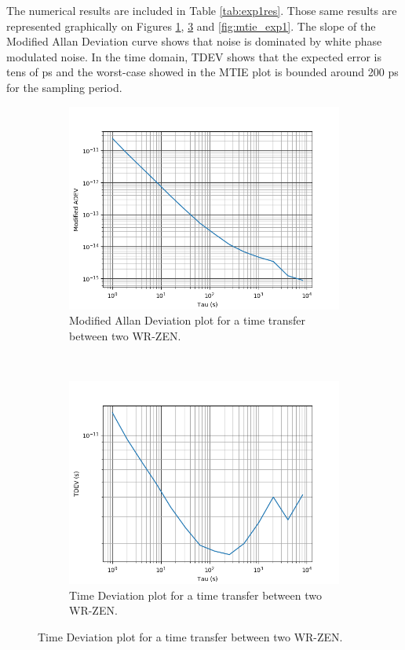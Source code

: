 The numerical results are included in Table \ref{tab:exp1res}. Those same 
results are represented graphically on Figures \ref{fig:mdev_exp1}, 
\ref{fig:tdev_exp1} and \ref{fig:mtie_exp1}. The slope of the Modified Allan 
Deviation curve shows that noise is dominated by white phase modulated noise. 
In the time domain, TDEV shows that the expected error is tens of ps and the 
worst-case showed in the MTIE plot is bounded around 200 ps for the sampling 
period. 


\begin{figure}
	\centering
	\begin{subfigure}[t]{0.48\textwidth}
		\includegraphics[width=\textwidth]{img/mdev_exp1}
		\caption[MDEV plot for the WR-ZEN]{Modified Allan Deviation plot for a 
		time transfer between two WR-ZEN.}
		\label{fig:mdev_exp1}
	\end{subfigure}
	~ %
	\begin{subfigure}[t]{0.48\textwidth}
		\includegraphics[width=\textwidth]{img/tdev_exp1}
		\caption[TDEV plot for the WR-ZEN]{Time Deviation plot for a time 
		transfer between two WR-ZEN.}
		\label{fig:tdev_exp1}
	\end{subfigure}
	

\end{figure}
